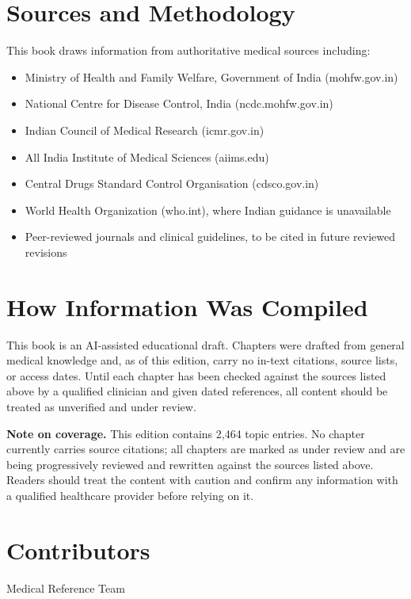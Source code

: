 \documentclass[12pt,oneside]{book}
\begin{document}







\appendix

\section*{Sources and Methodology}
This book draws information from authoritative medical sources including:
\begin{itemize}
  \item Ministry of Health and Family Welfare, Government of India (mohfw.gov.in)
  \item National Centre for Disease Control, India (ncdc.mohfw.gov.in)
  \item Indian Council of Medical Research (icmr.gov.in)
  \item All India Institute of Medical Sciences (aiims.edu)
  \item Central Drugs Standard Control Organisation (cdsco.gov.in)
  \item World Health Organization (who.int), where Indian guidance is unavailable
  \item Peer-reviewed journals and clinical guidelines, to be cited in future reviewed revisions
\end{itemize}

\section*{How Information Was Compiled}
This book is an AI-assisted educational draft. Chapters were drafted from general medical knowledge and, as of this edition, carry no in-text citations, source lists, or access dates. Until each chapter has been checked against the sources listed above by a qualified clinician and given dated references, all content should be treated as unverified and under review.

\medskip
\noindent\textbf{Note on coverage.} This edition contains 2,464 topic entries. No chapter currently carries source citations; all chapters are marked as under review and are being progressively reviewed and rewritten against the sources listed above. Readers should treat the content with caution and confirm any information with a qualified healthcare provider before relying on it.

\section*{Contributors}
Medical Reference Team
\end{document}
